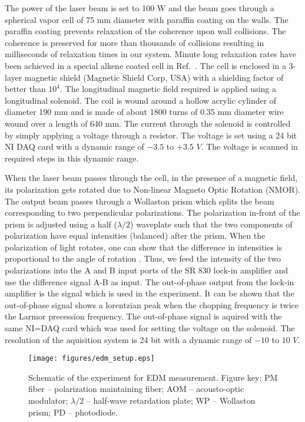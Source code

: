 The power of the laser beam is set to 100 \textmu W and the beam goes through a spherical vapor cell of 75 mm diameter with paraffin coating on the walls. The paraffin coating prevents relaxation of the coherence upon wall collisions. The coherence is preserved for more than thousands of collisions resulting in milliseconds of relaxation times in our system. Minute long relaxation rates have been achieved in a special alkene coated cell in Ref.\ \cite{BKL10}. The cell is enclosed in a 3-layer magnetic shield (Magnetic Shield Corp, USA) with a shielding factor of better than $10^4$. The longitudinal magnetic field required is applied using a longitudinal solenoid. The coil is wound around a hollow acrylic cylinder of diameter 190 mm and is made of about 1800 turns of 0.35 mm diameter wire wound over a length of 640 mm. The current through the solenoid is controlled by simply applying a voltage through a resistor. The voltage is set using a 24 bit NI DAQ card with a dynamic range of $-3.5$ to $+3.5$ $V$. The voltage is scanned in required steps in this dynamic range. 

When the laser beam passes through the cell, in the presence of a magnetic field, its polarization gets rotated due to Non-linear Magneto Optic Rotation (NMOR). The output beam passes through a Wollaston prism which splits the beam corresponding to two perpendicular polarizations. The polarization in-front of the prism is adjusted using a half ($\lambda/2$) waveplate such that the two components of polarization have equal intensities (balanced) after the prism. When the polarization of light rotates, one can show that the difference in intensities is proportional to the angle of rotation \cite{BGK02}. Thus, we feed the intensity of the two polarizations into the A and B input ports of the SR 830 lock-in amplifier and use the difference signal A-B as input. The out-of-phase output from the lock-in amplifier is the signal which is used in the experiment. It can be shown that the out-of-phase signal shows a lorentzian peak when the chopping frequency is twice the Larmor precession frequency. The out-of-phase signal is aquired with the same NI=DAQ card which was used for setting the voltage on the solenoid. The resolution of the aquisition system is 24 bit with a dynamic range of $-10$ to $10$ $V$.



\begin{figure}[ht]
\centering
\texttt{[image: figures/edm\_setup.eps]}
\caption{Schematic of the experiment for EDM measurement. Figure key: PM fiber -- polarization maintaining fiber; AOM -- acousto-optic modulator; $\lambda/2 $ -- half-wave retardation plate; WP -- Wollaston prism; PD -- photodiode.}
\label{fig:edm_setup}
\end{figure}

